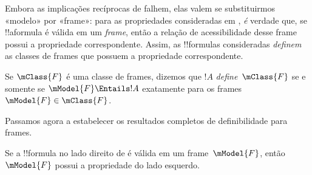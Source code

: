 \documentclass[../../../include/open-logic-section]{subfiles}
\begin{document}


Embora as implicações recíprocas de  falhem,
elas valem se substituirmos «modelo» por «frame»: para as propriedades
consideradas em , \emph{é} verdade que, se
!!a{formula} é válida em um \emph{frame}, então a relação de acessibilidade
desse frame possui a propriedade correspondente. Assim, as !!{formula}s
consideradas \emph{definem} as classes de frames que possuem a propriedade
correspondente.

\begin{defn}
  Se $\mClass{F}$ é uma classe de frames, dizemos que $!A$
  \emph{define}~$\mClass{F}$ se e somente se $\mModel{F} \Entails !A$
  exatamente para os frames~$\mModel{F} \in \mClass{F}$.
\end{defn}

Passamos agora a estabelecer os resultados completos de definibilidade para
frames.

\begin{thm}
Se a !!{formula} no lado direito de  é válida em um
frame~$\mModel{F}$, então $\mModel{F}$ possui a propriedade do lado esquerdo.
\end{thm}
\end{document}
